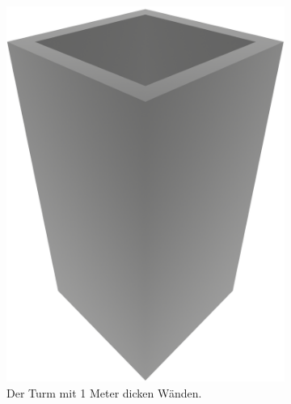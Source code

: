 \begin{figure}[ht!]
  \hspace*{\fill}%
  \begin{subfigure}[b]{0.3\columnwidth}
    \includegraphics[width=\columnwidth]{fig/render_base_thin.png}
    \caption{Der Turm mit 1 Meter dicken Wänden.}\label{fig:poc:render_crossbond}
  \end{subfigure}
  \hfill%
  \begin{subfigure}[b]{0.3\columnwidth}

\end{subfigure}
\end{figure}
